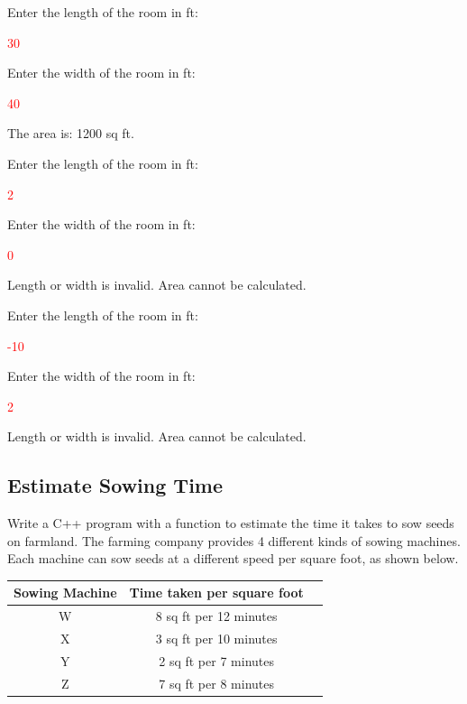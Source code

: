\begin{sample}
Enter the length of the room in ft:

 \textcolor{red}{30}
 
Enter the width of the room in ft:

 \textcolor{red}{40}
 
The area is: 1200 sq ft.


\end{sample}

\begin{sample}
Enter the length of the room in ft:

 \textcolor{red}{2}
 
Enter the width of the room in ft:

 \textcolor{red}{0}
 
Length or width is invalid. Area cannot be calculated.
\end{sample}
\begin{sample}
Enter the length of the room in ft:

 \textcolor{red}{-10}
 
Enter the width of the room in ft:

 \textcolor{red}{2}
 
Length or width is invalid. Area cannot be calculated.

\end{sample}

\subsection{Estimate Sowing Time}
Write a C++ program with a function to estimate the time it takes to sow seeds on farmland. The farming company provides 4 different kinds of sowing machines. Each machine can sow seeds at a different speed per square foot, as shown below.

\begin{table}[H]
    \centering
       \begin{tabular}{|c|c|c|}
    \hline
    \textbf{Sowing Machine} & \textbf{Time taken per square foot} 
    \\
    \hline
    W & 8 sq ft per 12 minutes
    \\
    \hline
    X & 3 sq ft per 10 minutes 
    \\
    \hline
    Y & 2 sq ft per 7 minutes \\
     \hline
    Z & 7 sq ft per 8 minutes \\
    \hline
    \end{tabular}

\end{table}

